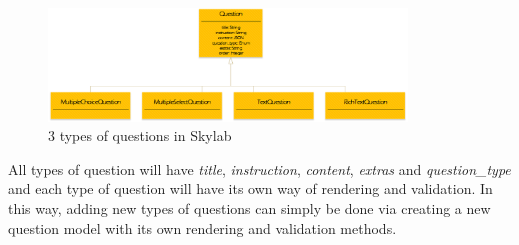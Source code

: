 \begin{figure}[h]
    \centering
    \includegraphics[width=0.85\textwidth]{Images/Skylab_Questions.png}
    \caption{3 types of questions in Skylab}
\end{figure}

All types of question will have \textit{title}, \textit{instruction}, \textit{content}, \textit{extras} and \textit{question\_type} and each type of question will have its own way of rendering and validation. In this way, adding new types of questions can simply be done via creating a new question model with its own rendering and validation methods.
